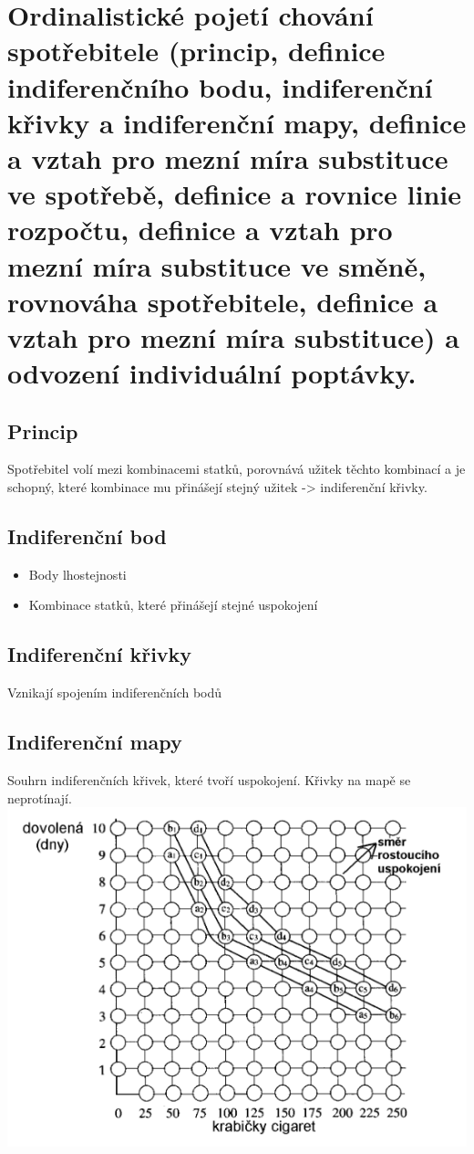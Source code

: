 \clearpage
\section{Ordinalistické pojetí chování spotřebitele (princip, definice indiferenčního bodu,
indiferenční křivky a indiferenční mapy, definice a vztah pro mezní míra substituce ve
spotřebě, definice a rovnice linie rozpočtu, definice a vztah pro mezní míra substituce
ve směně, rovnováha spotřebitele, definice a vztah pro mezní míra substituce) a
odvození individuální poptávky.}

\subsection{Princip}
Spotřebitel volí mezi kombinacemi statků, porovnává užitek těchto kombinací a je schopný, které kombinace mu přinášejí stejný užitek -> indiferenční křivky.

\subsection{Indiferenční bod}
\begin{itemize}
    \item Body lhostejnosti
    \item Kombinace statků, které přinášejí stejné uspokojení
\end{itemize}

\subsection{Indiferenční křivky}
Vznikají spojením indiferenčních bodů

\subsection{Indiferenční mapy}
Souhrn indiferenčních křivek, které tvoří  uspokojení. Křivky na mapě se neprotínají. \\
\includegraphics[width=16cm]{images/06_indif_mapa.png}

